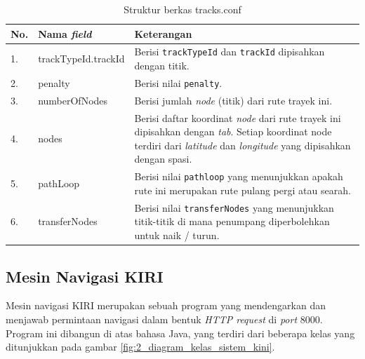 \begin{table}
	\caption{Struktur berkas tracks.conf}
	\label{tab:2_struktur_tracks_conf}
	\begin{tabular}{|p{0.5cm}|p{3.5cm}|p{11cm}|}
		\hline
		No. & Nama \textit{field} & Keterangan \\
		\hline
		1. & trackTypeId.trackId & Berisi \verb/trackTypeId/ dan \verb/trackId/
			dipisahkan dengan titik. \\
		2. & penalty & Berisi nilai \verb/penalty/. \\
		3. & numberOfNodes & Berisi jumlah \textit{node} (titik) dari rute
			trayek ini. \\
		4. & nodes & Berisi daftar koordinat \textit{node} dari rute trayek
			ini dipisahkan dengan \textit{tab}. Setiap koordinat node terdiri
			dari \textit{latitude} dan \textit{longitude} yang dipisahkan
			dengan spasi. \\
		5. & pathLoop & Berisi nilai \verb/pathloop/ yang menunjukkan apakah
			rute ini merupakan rute pulang pergi atau searah. \\
		6. & transferNodes & Berisi nilai \verb/transferNodes/ yang menunjukkan
			titik-titik di mana penumpang diperbolehkan untuk naik / turun. \\
		\hline
	\end{tabular}
\end{table}

\subsection{Mesin Navigasi KIRI}

Mesin navigasi KIRI merupakan sebuah program yang mendengarkan dan menjawab
permintaan navigasi dalam bentuk \textit{HTTP request} di \textit{port} 8000.
Program ini dibangun di atas bahasa Java, yang terdiri dari beberapa kelas yang
ditunjukkan pada gambar \ref{fig:2_diagram_kelas_sistem_kini}.

